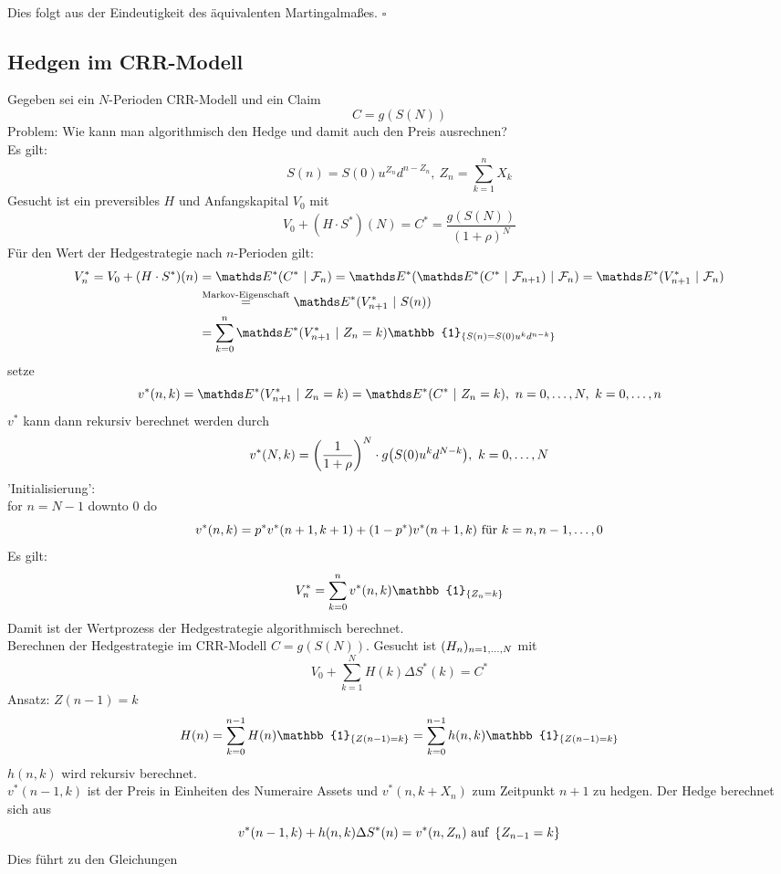 \\
Dies folgt aus der Eindeutigkeit des äquivalenten Martingalmaßes.
\hfill $\square$

\subsection{Hedgen im CRR-Modell}
\label{sub:hedgen_im_crr-modell}
Gegeben sei ein $N$-Perioden CRR-Modell und ein Claim
\[
C=g(S(N))
\]
Problem: Wie kann man algorithmisch den Hedge und damit auch den Preis ausrechnen?\\
Es gilt:
\[
S(n)=S(0)u^{Z_n}d^{n-Z_n},~Z_n=\sum_{k=1}^{n}X_k
\]
Gesucht ist ein preversibles $H$ und Anfangskapital $V_0$ mit
\[
V_0+(H\cdot S^*)(N)=C^*=\frac{g(S(N))}{(1+\rho)^N}
\]
Für den Wert der Hedgestrategie nach $n$-Perioden gilt:
\begin{equation*}
\begin{aligned}
V_n^*=V_0+(H\cdot S^*)(n) &= \E^*(C^*~|~\F_n) = \E^*(\E^*(C^*~|~\F_{n+1})~|~\F_n) = \E^*(V_{n+1}^*~|~\F_n)\\
&\stackrel{\text{Markov-Eigenschaft}}{=} \E^*(V_{n+1}^*~|~S(n))\\
&= \sum_{k=0}^{n}\E^*(V_{n+1}^*~|~Z_n=k)\mathbb{1}_{\penbrace{S(n)=S(0)u^kd^{n-k}}}
\end{aligned}
\end{equation*}
setze
\[
v^*(n,k)=\E^*(V_{n+1}^*~|~Z_n=k)=\E^*(C^*~|~Z_n=k),~ n=0\dt{,}N,~k=0\dt{,}n
\]
$v^*$ kann dann rekursiv berechnet werden durch
\[
v^*(N,k)=\left( \frac{1}{1+\rho}\right)^N\cdot g\big(S(0)u^kd^{N-k}\big),~k=0, \dots ,N
\]
'Initialisierung':\\
for $n=N-1$ downto 0 do
\[
v^*(n,k)= p^*v^*(n+1,k+1)+(1-p^*)v^*(n+1,k) \text{ für } k=n,n-1, \dots ,0
\]
Es gilt:
\[
V_n^*=\sum_{k=0}^{n}v^*(n,k)\mathbb{1}_{\penbrace{Z_n=k}}
\]
Damit ist der Wertprozess der Hedgestrategie algorithmisch berechnet.\\
Berechnen der Hedgestrategie im CRR-Modell $C=g(S(N))$.
Gesucht ist $(H_n)_{n=1, \dots ,N}$ mit
\[
V_0+\sum_{k=1}^{N}H(k)\Delta S^*(k)=C^*
\]
Ansatz: $Z(n-1)=k$\\
\[
H(n)=\sum_{k=0}^{n-1}H(n)\mathbb{1}_{\penbrace{Z(n-1)=k}}=\sum_{k=0}^{n-1}h(n,k)\mathbb{1}_{\penbrace{Z(n-1)=k}}
\]
$h(n,k)$ wird rekursiv berechnet.\\
$v^*(n-1,k)$ ist der Preis in Einheiten des Numeraire Assets und $v^*(n,k+X_n)$ zum Zeitpunkt $n+1$ zu hedgen.
Der Hedge berechnet sich aus
\[
v^*(n-1,k)+h(n,k)\Delta S^*(n)=v^*(n,Z_n)\text{ auf }\left\{Z_{n-1}=k\right\}
\]
Dies führt zu den Gleichungen
